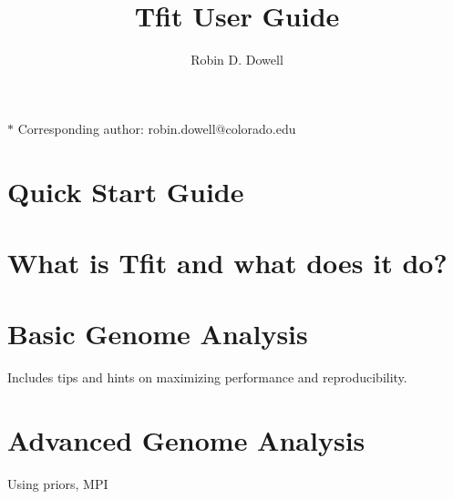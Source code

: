 \documentclass[11pt]{article}
\title{Tfit User Guide}
\author{Robin D. Dowell}
\date{}
\date{ }
\begin{document}
\maketitle
\noindent $*$ Corresponding author: robin.dowell@colorado.edu

\section{Quick Start Guide}

\section{What is Tfit and what does it do?}

\section{Basic Genome Analysis}
Includes tips and hints on maximizing performance and reproducibility.

\section{Advanced Genome Analysis}
Using priors, MPI

\small{
  
  {}
}
\end{document}

